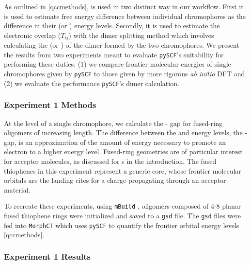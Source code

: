 As outlined in \autoref{qccmethods},  is used in two distinct way in our workflow. 
First it is used to estimate free energy
difference between individual chromophores as the difference in their  (or ) energy levels.
Secondly, it is used to estimate the electronic overlap ($T_{ij}$) with the dimer splitting method which involves
calculating the  (or ) of the dimer formed by the two chromophores. We present the results from two
experiments meant to evaluate \texttt{pySCF}'s suitability for performing these duties:
(1) we compare frontier molecular energies of single chromophores given by \texttt{pySCF} to those
given by more rigorous \textit{ab initio} DFT and (2) we evaluate the performance \texttt{pySCF}'s dimer calculation.

\subsubsection{Experiment 1 Methods}

At the level of a single chromophore, we calculate the - gap for fused-ring
oligomers of increasing length. 
The difference between the  and  energy levels, the - gap, is an approximation of the amount
of energy necessary to promote an electron to a higher energy level.  
Fused-ring geometries are of particular interest for accepter
molecules, as discussed for s in the introduction. 
The fused thiophenes in this experiment represent a generic  core, whose frontier molecular orbitals are
the landing cites for a charge propagating through an acceptor material. 

To recreate these experiments, using \texttt{mBuild} \cite{Klein2016}, oligomers composed of 4-8 planar fused thiophene rings
were initialized and saved to a \texttt{gsd} file. The \texttt{gsd} files were fed into \texttt{MorphCT} which uses \texttt{pySCF} to quantify the
frontier orbital energy levels \autoref{qccmethods}.

\subsubsection{Experiment 1 Results}

